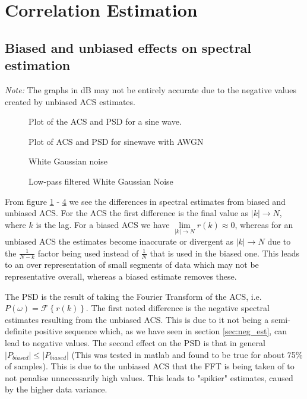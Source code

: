 \documentclass[10pt,twoside,a4paper]{report}
\begin{document}
\section{Correlation Estimation}
\subsection{Biased and unbiased effects on spectral estimation}

\label{sec:bia_un_effect}
\textit{Note:} The graphs in dB may not be entirely accurate due to the negative values created by unbiased ACS estimates.

\begin{figure}[h!]
\centering
\resizebox{\textwidth}{!}{}
\caption{Plot of the ACS and PSD for a sine wave.}
\label{fig:2_2a1}
\end{figure}
\begin{figure}[h!]
\centering
\resizebox{\textwidth}{!}{}
\caption{Plot of ACS and PSD for sinewave with AWGN}
\label{fig:2_2a2}
\end{figure}
\begin{figure}[h!]
\centering
\resizebox{\textwidth}{!}{}
\caption{White Gaussian noise}
\label{fig:2_2a3}
\end{figure}
\begin{figure}[h!]
\centering
\resizebox{\textwidth}{!}{}
\caption{Low-pass filtered White Gaussian Noise}
\label{fig:2_2a4}
\end{figure}
\FloatBarrier
From figure \ref{fig:2_2a1} - \ref{fig:2_2a4} we see the differences in spectral estimates from biased and unbiased ACS. For the ACS the first difference is the final value as $|k| \to N$, where $k$ is the lag. For a biased ACS we have $\lim\limits_{|k|\to N} r(k) \approx 0$, whereas for an unbiased ACS the estimates become inaccurate or divergent as $|k|\to N$ due to the $\frac{1}{N-k}$ factor being used instead of $\frac{1}{N}$ that is used in the biased one. This leads to an over representation of small segments of data which may not be representative overall, whereas a biased estimate removes these.

The PSD is the result of taking the Fourier Transform of the ACS, i.e. $P(\omega) = \mathscr{F}\left\{r(k)\right\}$. The first noted difference is the negative spectral estimates resulting from the unbiased ACS. This is due to it not being a semi-definite positive sequence which, as we have seen in section \ref{sec:neg_est}, can lead to negative values. The second effect on the PSD is that in general $|P_{biased}| \leq |P_{biased}|$ (This was tested in matlab and found to be true for about 75\% of samples). This is due to the unbiased ACS that the FFT is being taken of to not penalise unnecessarily high values. This leads to "spikier" estimates, caused by the higher data variance.
\FloatBarrier
\end{document}
